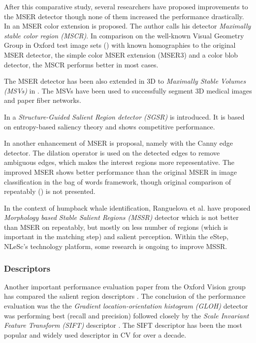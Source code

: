 After this comparative study, several researchers have proposed improvements to the MSER detector though none of them increased the performance drastically. 
In \cite{Forssen07} an MSER color extension is proposed. The author calls his detector {\em Maximally stable color region (MSCR)}. In comparison on the well-known Visual Geometry Group in Oxford test image sets (\cite{vgg_soft_data}) with known homographies to the original MSER detector, the simple color MSER extension (MSER3) and a color blob detector, the MSCR performs better in most cases. 

The MSER detector has been also extended in 3D to {\em Maximally Stable Volumes (MSVs)} in \cite{DonoserB06}. The MSVs have been used to successfully segment 3D medical images and paper fiber networks.

In \cite{Fan08} a {\em Structure-Guided Salient Region detector (SGSR)} is introduced. It is based on entropy-based saliency theory and shows competitive performance.

In \cite{Wang14} another enhancement of MSER is proposal, namely with the Canny edge detector. The dilation operator is used on the detected edges to remove ambiguous edges, which makes the interest regions more representative. The improved MSER shows better performance than the original MSER in image classification in the bag of words framework, though original comparison of repeatably (\cite{Mikolajczyk:2005}) is not presented. 

In the context of humpback whale identification, Ranguelova et al. \cite{RangMSSR06, RangHumpb06} have proposed {\em Morphology based Stable Salient Regions (MSSR) } detector which is not better than MSER on repeatably, but mostly on less number of regions (which is important in the matching step) and salient perception. Within the eStep, NLeSc's technology platform, some research is ongoing to improve MSSR.

\subsubsection{Descriptors}
Another important performance evaluation paper from the Oxford Vision group has compared the salient region descriptors \cite{MS05}. The conclusion of the performance evaluation was the the {\em Gradient location-orientation histogram (GLOH)} detector was performing best (recall and precision) followed closely by the {\em Scale Invariant Feature Transform (SIFT)} descriptor \cite{Lowe:2004}. The SIFT descriptor has been the most popular and widely used descriptor in CV for over a decade. 

